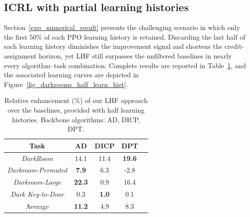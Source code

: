 \documentclass{article}
\begin{document}
\subsection{ICRL with partial learning histories}
\label{append_addition_result_half_learn_hist}
Section~\ref{exp_numerical_result} presents the challenging scenario in which only the first \(50\%\) of each PPO learning history is retained.
Discarding the last half of each learning history diminishes the improvement signal and shortens the credit-assignment horizon, yet LHF still surpasses the unfiltered baselines in nearly every algorithm–task combination.
Complete results are reported in
Table~\ref{tab_darkrooms_half_learn_hist}, and the associated learning curves are depicted in Figure~\ref{fig_darkrooms_half_learn_hist}.
\begin{table}[ht]
    \caption{Relative enhancement (\%) of our LHF approach over the baselines, provided with half learning histories. Backbone algorithms: AD, DICP, DPT.}
    \label{tab_darkrooms_half_learn_hist}
    \centering
    \begin{tabular}{ccccc}
    \toprule
    Task & AD & DICP & DPT \\
    \midrule
     \textit{DarkRoom} & 14.1 & 11.4 & \textbf{19.6} \\
     \textit{Darkroom-Permuted} & \textbf{7.9} & 6.3 & -2.8 \\
     \textit{Darkroom-Large} & \textbf{22.3} & 0.9 & 16.4 \\
     \textit{Dark Key-to-Door} & 0.3 & \textbf{1.0} & 0.1 \\
    \midrule
    Average & \textbf{11.2} & 4.9 & 8.3 \\
    \bottomrule
    \end{tabular}
\end{table}
\end{document}
